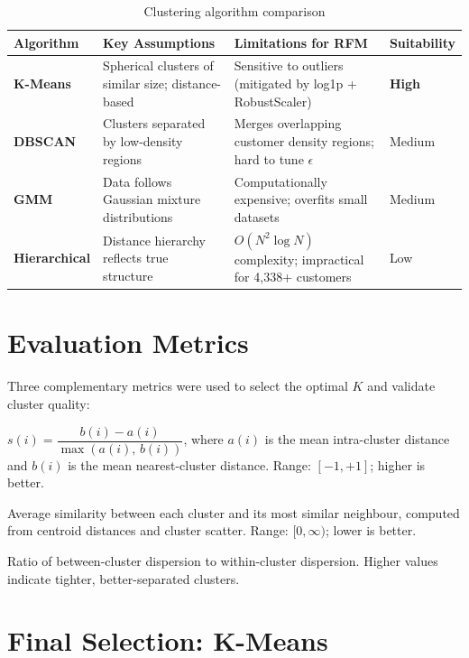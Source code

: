 \documentclass[12pt,a4paper]{report}
\begin{document}
\begin{table}[H]
\centering
\caption{Clustering algorithm comparison}
\begin{tabularx}{\textwidth}{lXXl}
\toprule
\textbf{Algorithm} & \textbf{Key Assumptions} & \textbf{Limitations for RFM} & \textbf{Suitability} \\
\midrule
\textbf{K-Means} & Spherical clusters of similar size; distance-based & Sensitive to outliers (mitigated by log1p + RobustScaler) & \textbf{High} \\[4pt]
\textbf{DBSCAN} & Clusters separated by low-density regions & Merges overlapping customer density regions; hard to tune $\epsilon$ & Medium \\[4pt]
\textbf{GMM} & Data follows Gaussian mixture distributions & Computationally expensive; overfits small datasets & Medium \\[4pt]
\textbf{Hierarchical} & Distance hierarchy reflects true structure & $O(N^2 \log N)$ complexity; impractical for 4,338+ customers & Low \\
\bottomrule
\end{tabularx}
\end{table}

\section{Evaluation Metrics}

Three complementary metrics were used to select the optimal $K$ and validate cluster quality:

\begin{description}[leftmargin=1.8em]
  \item[Silhouette Coefficient (primary)] $s(i) = \dfrac{b(i) - a(i)}{\max(a(i),\,b(i))}$, where $a(i)$ is the mean intra-cluster distance and $b(i)$ is the mean nearest-cluster distance. Range: $[-1,+1]$; higher is better.

  \item[Davies-Bouldin Index (secondary)] Average similarity between each cluster and its most similar neighbour, computed from centroid distances and cluster scatter. Range: $[0, \infty)$; lower is better.

  \item[Calinski-Harabasz Score (tertiary)] Ratio of between-cluster dispersion to within-cluster dispersion. Higher values indicate tighter, better-separated clusters.
\end{description}

\section{Final Selection: K-Means}
\end{document}
